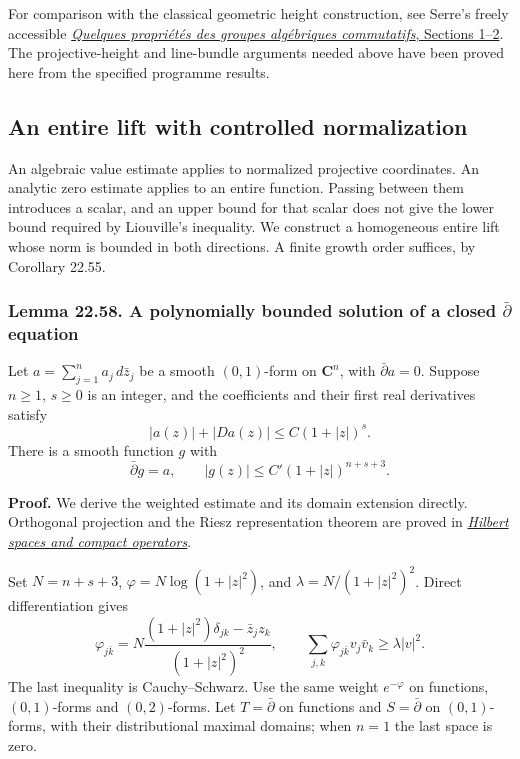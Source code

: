 \documentclass[
  11pt,
  a4paper,
]{article}
\begin{document}
For comparison with the classical geometric height construction, see
Serre's freely accessible
\href{https://numdam.org/item/AST_1979__69-70__191_0.pdf}{\emph{Quelques
propriétés des groupes algébriques commutatifs}, Sections 1--2}. The
projective-height and line-bundle arguments needed above have been
proved here from the specified programme results.

\subsection{An entire lift with controlled
normalization}\label{an-entire-lift-with-controlled-normalization}

An algebraic value estimate applies to normalized projective
coordinates. An analytic zero estimate applies to an entire function.
Passing between them introduces a scalar, and an upper bound for that
scalar does not give the lower bound required by Liouville's inequality.
We construct a homogeneous entire lift whose norm is bounded in both
directions. A finite growth order suffices, by Corollary 22.55.

\subsubsection{\texorpdfstring{Lemma 22.58. A polynomially bounded
solution of a closed \(\bar\partial\)
equation}{Lemma 22.58. A polynomially bounded solution of a closed \textbackslash bar\textbackslash partial equation}}\label{lemma-22.58.-a-polynomially-bounded-solution-of-a-closed-barpartial-equation}

Let \(a=\sum_{j=1}^n a_j\,d\bar z_j\) be a smooth \((0,1)\)-form on
\(\mathbf C^n\), with \(\bar\partial a=0\). Suppose \(n\ge1\), \(s\ge0\)
is an integer, and the coefficients and their first real derivatives
satisfy \[
 |a(z)|+|Da(z)|\le C(1+|z|)^s.
 \tag{22.139}
\] There is a smooth function \(g\) with \[
 \bar\partial g=a,\qquad |g(z)|\le C'(1+|z|)^{n+s+3}.
 \tag{22.140}
\]

\textbf{Proof.} We derive the weighted estimate and its domain extension
directly. Orthogonal projection and the Riesz representation theorem are
proved in
\href{https://kokunoyumeto.github.io/open-math-courses-public/courses/foundations-of-von-neumann-algebras/hilbert-spaces-and-compact-operators.html}{\emph{Hilbert
spaces and compact operators}}.

Set \(N=n+s+3\), \(\varphi=N\log(1+|z|^2)\), and
\(\lambda=N/(1+|z|^2)^2\). Direct differentiation gives \[
 \varphi_{j\bar k}
 =N\frac{(1+|z|^2)\delta_{jk}-\bar z_j z_k}{(1+|z|^2)^2},
 \qquad
 \sum_{j,k}\varphi_{j\bar k}v_j\bar v_k\ge\lambda|v|^2.
 \tag{22.141}
\] The last inequality is Cauchy--Schwarz. Use the same weight
\(e^{-\varphi}\) on functions, \((0,1)\)-forms and \((0,2)\)-forms. Let
\(T=\bar\partial\) on functions and \(S=\bar\partial\) on
\((0,1)\)-forms, with their distributional maximal domains; when \(n=1\)
the last space is zero.
\end{document}

